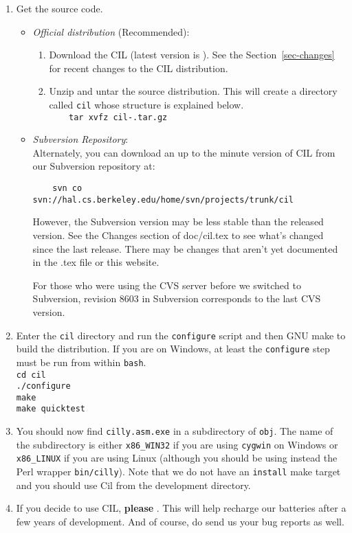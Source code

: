 \documentclass{article}
\def\secref#1{Section~\ref{sec-#1}}
\newcommand{\hsp}{\hspace{0.5in}}
\def\t#1{{\tt #1}}
\begin{document}
\begin{enumerate}
\item Get the source code.
\begin{itemize}
\item {\em Official distribution} (Recommended):
\begin{enumerate}
\item Download the CIL  (latest version is
). See the \secref{changes} for recent changes to the CIL distribution.
\item Unzip and untar the source distribution. This will create a directory
      called \t{cil} whose structure is explained below. \\
      \t{~~~~tar xvfz cil-\cilversion.tar.gz}
\end{enumerate}
\item {\em Subversion Repository}: \\
  Alternately, you can download an up to the minute version of CIL
  from our Subversion repository at:
\begin{verbatim}
    svn co svn://hal.cs.berkeley.edu/home/svn/projects/trunk/cil
\end{verbatim}
However, the Subversion version may be less stable than the released
version.  See the Changes section of doc/cil.tex to see what's
changed since the last release.  There may be changes that aren't yet
documented in the .tex file or this website.

For those who were using the CVS server before we switched to
Subversion, revision 8603 in Subversion corresponds to the last CVS
version.

\end{itemize}
\item Enter the \t{cil} directory and run the \t{configure} script and then 
      GNU make to build the distribution. If you are on Windows, at least the
      \t{configure} step must be run from within \t{bash}. \\
      \hsp\verb!cd cil!\\
      \hsp\verb!./configure!\\
      \hsp\verb!make!\\
      \hsp\verb!make quicktest!\\

\item You should now find \t{cilly.asm.exe} in a subdirectory of \t{obj}. The
name of the subdirectory is either \t{x86\_WIN32} if you are using \t{cygwin}
on Windows or \t{x86\_LINUX} if you are using Linux (although you should be
using instead the Perl wrapper \t{bin/cilly}). Note that we do not have an
\t{install} make target and you should use Cil from the development directory.
\item If you decide to use CIL, {\bf please}
. This will help recharge
our batteries after a few years of development. And of course, do send us
your bug reports as well.
\end{enumerate}
\end{document}
